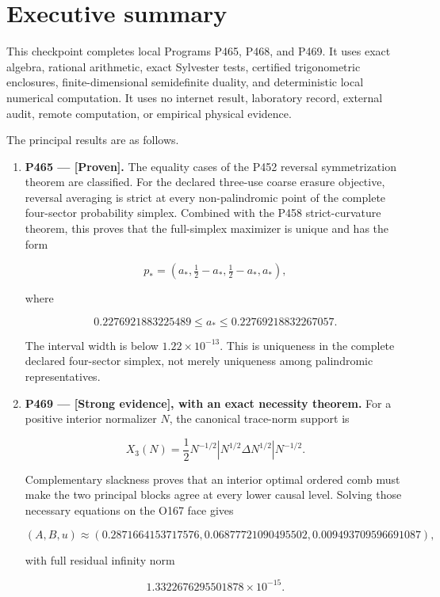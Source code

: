 \documentclass[11pt,a4paper,openany]{report}
\newcommand{\statusProven}{\textcolor{fingreen}{[Proven]}}
\newcommand{\statusStrong}{\textcolor{finblue}{[Strong evidence]}}
\begin{document}
\chapter{Executive summary}

This checkpoint completes local Programs P465, P468, and P469. It uses exact algebra, rational arithmetic, exact Sylvester tests, certified trigonometric enclosures, finite-dimensional semidefinite duality, and deterministic local numerical computation. It uses no internet result, laboratory record, external audit, remote computation, or empirical physical evidence.

The principal results are as follows.

\begin{enumerate}
\item 
\textbf{P465 --- \statusProven{}.} The equality cases of the P452 reversal symmetrization theorem are classified. For the declared three-use coarse erasure objective, reversal averaging is strict at every non-palindromic point of the complete four-sector probability simplex. Combined with the P458 strict-curvature theorem, this proves that the full-simplex maximizer is unique and has the form

\[
   p_*=(a_*,\tfrac12-a_*,\tfrac12-a_*,a_*),
   \]

where

\[
   0.2276921883225489
   \le a_*\le
   0.22769218832267057.
   \]

The interval width is below \(1.22\times10^{-13}\). This is uniqueness in the complete declared four-sector simplex, not merely uniqueness among palindromic representatives.

\item 
\textbf{P469 --- \statusStrong{}, with an exact necessity theorem.} For a positive interior normalizer \(N\), the canonical trace-norm support is

\[
   X_3(N)=\frac12N^{-1/2}
   \left|N^{1/2}\Delta N^{1/2}\right|N^{-1/2}.
   \]

Complementary slackness proves that an interior optimal ordered comb must make the two principal blocks agree at every lower causal level. Solving those necessary equations on the O167 face gives

\[
   (A,B,u)\approx
   (0.2871664153717576,
    0.06877721090495502,
    0.009493709596691087),
   \]

with full residual infinity norm

\[
   1.3322676295501878\times10^{-15}.
   \]


\end{enumerate}
\end{document}
